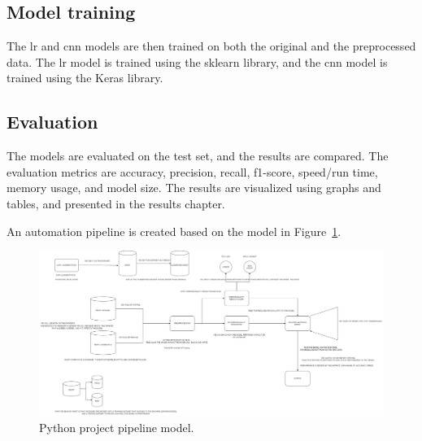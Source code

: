 \subsection{Model training}\label{subsec:model-training}
The \gls{lr} and \gls{cnn} models are then trained on both the original and the preprocessed data. The \gls{lr} model is trained using the \gls{sklearn} library, and the \gls{cnn} model is trained using the Keras library.

\subsection{Evaluation}\label{subsec:evaluation}
The models are evaluated on the test set, and the results are compared. The evaluation metrics are accuracy, precision, recall, f1-score, speed/run time, memory usage, and model size. The results are visualized using graphs and tables, and presented in the results chapter.






An automation pipeline is created based on the model in Figure~\ref{fig:python-pipeline-model}.


\begin{figure}[htb!]
    \centering
    \includegraphics[width=\textwidth]{figures/pipeline-draft.png}
    \caption{Python project pipeline model.}
    \label{fig:python-pipeline-model}
\end{figure}


